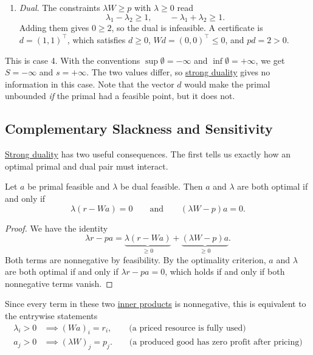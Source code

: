 \begin{example}
\begin{enumerate}
			\item \textit{Dual}. The constraints $\lambda W \geq p$ with $\lambda \geq 0$ read 
				\begin{equation}
					\lambda_1 - \lambda_2 \geq 1, \qquad -\lambda_1 + \lambda_2 \geq 1.
				\end{equation}
				Adding them gives $0 \geq 2$, so the dual is infeasible. A certificate is $d = (1, 1)^\top$, which satisfies $d \geq 0$, $Wd = (0, 0)^\top \leq 0$, and $pd = 2 > 0$. 
		\end{enumerate}
		This is case 4. With the conventions $\sup \emptyset = -\infty$ and $\inf \emptyset = +\infty$, we get $S = -\infty$ and $s = +\infty$. The two values differ, so \hyperref[thm:strong-duality]{strong duality} gives no information in this case. Note that the vector $d$ would make the primal unbounded \textit{if} the primal had a feasible point, but it does not. 
	\end{example}

\subsection{Complementary Slackness and Sensitivity}

	\hyperref[thm:strong-duality]{Strong duality} has two useful consequences. The first tells us exactly how an optimal primal and dual pair must interact. 

	\begin{theorem}
	  \label{thm:complementary-slackness}
		Let $a$ be primal feasible and $\lambda$ be dual feasible. Then $a$ and $\lambda$ are both optimal if and only if
		\begin{equation}
			\lambda (r - Wa) = 0 \qquad \text{and} \qquad (\lambda W - p) a = 0.
		\end{equation}
	\end{theorem}
	\begin{proof}
		We have the identity 
		\begin{equation}
			\lambda r - pa = \underbrace{\lambda (r - Wa)}_{\geq 0} + \underbrace{(\lambda W - p) a}_{\geq 0}.
		\end{equation}
		Both terms are nonnegative by feasibility. By the optimality criterion, $a$ and $\lambda$ are both optimal if and only if $\lambda r - pa = 0$, which holds if and only if both nonnegative terms vanish. 
	\end{proof}

	Since every term in these two \hyperref[lin-def:inner-product]{inner products} is nonnegative, this is equivalent to the entrywise statements 
	\begin{align}
		\lambda_i > 0 &\implies (Wa)_i = r_i, \qquad \text{(a priced resource is fully used)}\\
		a_j > 0 &\implies (\lambda W)_j = p_j. \qquad \text{(a produced good has zero profit after pricing)}
	\end{align}

